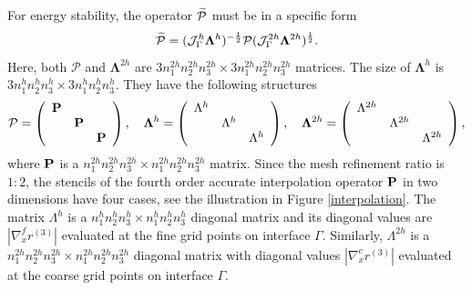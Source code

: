 For energy stability, the operator $ \widetilde{\mathcal{P}}$ must be in a specific form 
\[\widetilde{\mathcal{P}} = (\mathcal{J}^h_\Gamma \bm{\Lambda}^h)^{-\frac{1}{2}}\mathcal{P}(\mathcal{J}^{2h}_\Gamma \bm{\Lambda}^{2h})^{\frac{1}{2}}.\]
Here, both  $\mathcal{P}$ and $\bm{\Lambda}^{2h}$ are $3n_1^{2h}n_2^{2h}n_3^{2h}\times 3n_1^{2h}n_2^{2h}n_3^{2h}$ matrices. The size of $\bm{\Lambda}^{h}$ is $3n_1^{h}n_2^{h}n_3^{h}\times 3n_1^{h}n_2^{h}n_3^{h}$. They have the following structures
\begin{align}\label{iandr}
\mathcal{P} = \left(\begin{array}{ccc}
{\bf P}& ~  & ~ \\
~ & {\bf P} & ~ \\
~ &~  &{\bf P}\end{array}\right), \ \ \ 
\bm{\Lambda}^h = \left(\begin{array}{ccc}
\Lambda^h& ~  & ~ \\
~ & \Lambda^h & ~ \\
~ &~  &\Lambda^h\end{array}\right), \ \ \ \bm{\Lambda}^{2h} = \left(\begin{array}{ccc}
\Lambda^{2h}& ~  & ~ \\
~ & \Lambda^{2h} & ~ \\
~ &~  &\Lambda^{2h}\end{array}\right),
\end{align}
where $\bf P$ is a $n_1^{2h}n_2^{2h}n_3^{2h}\times n_1^{2h}n_2^{2h}n_3^{2h}$ matrix. Since the mesh refinement ratio is $1:2$, the stencils of the fourth order accurate interpolation operator ${\bf P}$ in two dimensions have four cases, see the illustration in  Figure \ref{interpolation}. 
The matrix $\Lambda^{h}$ is a $n_1^{h}n_2^{h}n_3^{h}\times n_1^{h}n_2^{h}n_3^{h}$ diagonal matrix and its diagonal values are $|\nabla_x^f r^{(3)}|$ evaluated at the fine grid points on interface $\Gamma$. Similarly, $\Lambda^{2h}$ is a $n_1^{2h}n_2^{2h}n_3^{2h}\times n_1^{2h}n_2^{2h}n_3^{2h}$ diagonal matrix with diagonal values  $|\nabla_x^c r^{(3)}|$ evaluated at the coarse grid points on interface $\Gamma$.

